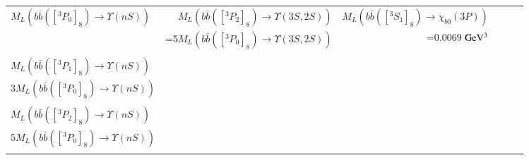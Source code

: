 \begin{table}
\begin{tabular*}{\textwidth}{@{\extracolsep{\fill}}lrrrrl@{}}
    $M_L(b\bar{b}([^3P_0]_8)\rightarrow\Upsilon(nS))$ & $M_L(b\bar{b}([^3P_2]_8)\rightarrow\Upsilon(3S,2S))$ &$M_L(b\bar{b}([^3S_1]_8)\rightarrow\chi_{b0}(3P))$ \\
    & =5$M_L(b\bar{b}([^3P_0]_8)\rightarrow\Upsilon(3S,2S))$ &=0.0069 ${\rm GeV^3}$ \\ \\
    
    $M_L(b\bar{b}([^3P_1]_8)\rightarrow\Upsilon(nS))$ & & \\
    3$M_L(b\bar{b}([^3P_0]_8)\rightarrow\Upsilon(nS))$ & &  \\ \\
    
    $M_L(b\bar{b}([^3P_2]_8)\rightarrow\Upsilon(nS))$ & & \\
    5$M_L(b\bar{b}([^3P_0]_8)\rightarrow\Upsilon(nS))$ & &  \\ \\
    \hline
    \hline
  \end{tabular*}
  \label{CSCO}
\end{table}
\normalsize

